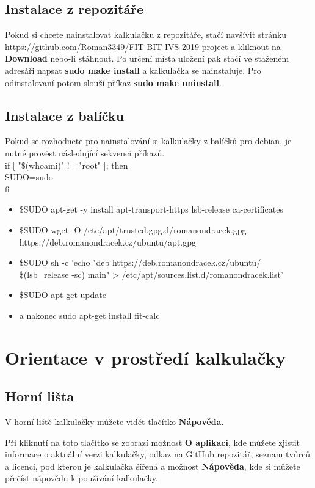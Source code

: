 \documentclass[12pt]{article}
\begin{document}
\subsection{Instalace z repozitáře}
Pokud si chcete nainstalovat kalkulačku z repozitáře, stačí navšívit stránku \\ 
\href{https://github.com/Roman3349/FIT-BIT-IVS-2019-project}{https://github.com/Roman3349/FIT-BIT-IVS-2019-project} a kliknout na \textbf{Download} nebo-li stáhnout. Po určení místa uložení pak stačí ve staženém adresáři napsat \textbf{sudo make install} a kalkulačka se nainstaluje. Pro odinstalovaní potom slouží příkaz \textbf{sudo make uninstall}.
\subsection{Instalace z balíčku}
Pokud se rozhodnete pro nainstalování si kalkulačky z balíčků pro debian, je nutné provést následující sekvenci příkazů. 
\\
if [ "\$(whoami)" != "root" ]; then \\
SUDO=sudo \\
fi 
\begin{itemize}
    \item \${SUDO} apt-get -y install apt-transport-https lsb-release ca-certificates
    \item \${SUDO} wget -O /etc/apt/trusted.gpg.d/romanondracek.gpg\\ https://deb.romanondracek.cz/ubuntu/apt.gpg 
    \item \${SUDO} sh -c 'echo "deb https://deb.romanondracek.cz/ubuntu/\\  \$(lsb\_release -sc) main" > /etc/apt/sources.list.d/romanondracek.list'
    \item \${SUDO} apt-get update
    \item a nakonec sudo apt-get install fit-calc
\end{itemize}

\section{Orientace v prostředí kalkulačky}
\subsection{Horní lišta}
V horní liště kalkulačky můžete vidět tlačítko \textbf{Nápověda}.

Při kliknutí na toto tlačítko se zobrazí možnost \textbf{O aplikaci}, kde můžete zjistit informace o aktuální verzi kalkulačky, odkaz na GitHub repozitář, seznam tvůrců a licenci, pod kterou je kalkulačka šířená a možnost \textbf{Nápověda}, kde si můžete přečíst nápovědu k používání kalkulačky.
\end{document}
